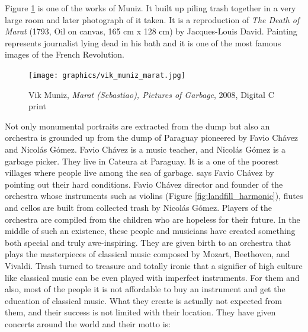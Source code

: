 Figure \ref{fig:VicMuniz_PicturesOfGarbage} is one of the works of Muniz. It built up piling trash together in a very large room and later photograph of it taken. It is a reproduction of \textit{The Death of Marat} (1793, Oil on canvas, 165 cm x 128 cm) by Jacques-Louis David. Painting represents journalist lying dead in his bath and it is one of the most famous images of the French Revolution.

\begin{figure}[h!]
  \centering
  \texttt{[image: graphics/vik\_muniz\_marat.jpg]}
  \caption{Vik Muniz, \textit{Marat (Sebastiao), Pictures of Garbage}, 2008, Digital C print}
  \label{fig:VicMuniz_PicturesOfGarbage}
\end{figure}

Not only monumental portraits are extracted from the dump but also an orchestra is grounded up from the dump of Paraguay pioneered by Favio Chávez and Nicolás Gómez. Favio Chávez is a music teacher, and Nicolás Gómez is a garbage picker. They live in Cateura at Paraguay. It is a one of the poorest villages where people live among the sea of garbage.  says Favio Chávez by pointing out their hard conditions. Favio Chávez director and founder of the orchestra whose instruments such as violins (Figure \ref{fig:landfill_harmonic}), flutes and cellos are built from collected trash by Nicolás Gómez. Players of the orchestra are compiled from the children who are hopeless for their future. In the middle of such an existence, these people and musicians have created something both special and truly awe-inspiring. They are given birth to an orchestra that plays the masterpieces of classical music composed by Mozart, Beethoven, and Vivaldi. Trash turned to treasure and totally ironic that a signifier of high culture like classical music can be even played with imperfect instruments. For them and also, most of the people it is not affordable to buy an instrument and get the education of classical music. What they create is actually not expected from them, and their success is not limited with their location. They have given concerts around the world and their motto is: 


